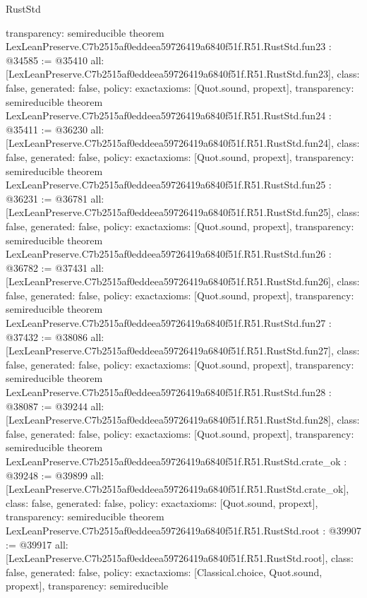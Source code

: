 \begin{lexlean}{RustStd}
\begin{coremodule}
{  transparency: semireducible
}
theorem LexLeanPreserve.C7b2515af0eddeea59726419a6840f51f.R51.RustStd.fun23 : @34585 := @35410 {
  all: [LexLeanPreserve.C7b2515af0eddeea59726419a6840f51f.R51.RustStd.fun23],
  class: false,
  generated: false,
  policy: exact{axioms: [Quot.sound, propext]},
  transparency: semireducible
}
theorem LexLeanPreserve.C7b2515af0eddeea59726419a6840f51f.R51.RustStd.fun24 : @35411 := @36230 {
  all: [LexLeanPreserve.C7b2515af0eddeea59726419a6840f51f.R51.RustStd.fun24],
  class: false,
  generated: false,
  policy: exact{axioms: [Quot.sound, propext]},
  transparency: semireducible
}
theorem LexLeanPreserve.C7b2515af0eddeea59726419a6840f51f.R51.RustStd.fun25 : @36231 := @36781 {
  all: [LexLeanPreserve.C7b2515af0eddeea59726419a6840f51f.R51.RustStd.fun25],
  class: false,
  generated: false,
  policy: exact{axioms: [Quot.sound, propext]},
  transparency: semireducible
}
theorem LexLeanPreserve.C7b2515af0eddeea59726419a6840f51f.R51.RustStd.fun26 : @36782 := @37431 {
  all: [LexLeanPreserve.C7b2515af0eddeea59726419a6840f51f.R51.RustStd.fun26],
  class: false,
  generated: false,
  policy: exact{axioms: [Quot.sound, propext]},
  transparency: semireducible
}
theorem LexLeanPreserve.C7b2515af0eddeea59726419a6840f51f.R51.RustStd.fun27 : @37432 := @38086 {
  all: [LexLeanPreserve.C7b2515af0eddeea59726419a6840f51f.R51.RustStd.fun27],
  class: false,
  generated: false,
  policy: exact{axioms: [Quot.sound, propext]},
  transparency: semireducible
}
theorem LexLeanPreserve.C7b2515af0eddeea59726419a6840f51f.R51.RustStd.fun28 : @38087 := @39244 {
  all: [LexLeanPreserve.C7b2515af0eddeea59726419a6840f51f.R51.RustStd.fun28],
  class: false,
  generated: false,
  policy: exact{axioms: [Quot.sound, propext]},
  transparency: semireducible
}
theorem LexLeanPreserve.C7b2515af0eddeea59726419a6840f51f.R51.RustStd.crate_ok : @39248 := @39899 {
  all: [LexLeanPreserve.C7b2515af0eddeea59726419a6840f51f.R51.RustStd.crate_ok],
  class: false,
  generated: false,
  policy: exact{axioms: [Quot.sound, propext]},
  transparency: semireducible
}
theorem LexLeanPreserve.C7b2515af0eddeea59726419a6840f51f.R51.RustStd.root : @39907 := @39917 {
  all: [LexLeanPreserve.C7b2515af0eddeea59726419a6840f51f.R51.RustStd.root],
  class: false,
  generated: false,
  policy: exact{axioms: [Classical.choice, Quot.sound, propext]},
  transparency: semireducible
}


\end{coremodule}
\end{lexlean}
